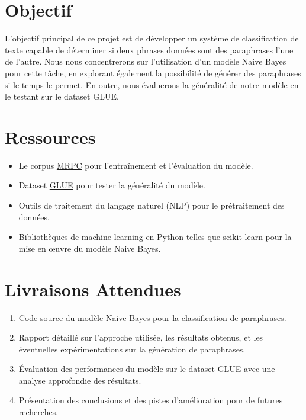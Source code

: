 \documentclass[12pt]{article}
\begin{document}



% 

\section{Objectif}
L'objectif principal de ce projet est de développer
un système de classification de texte capable de déterminer si deux
phrases données sont des paraphrases l'une de l'autre. Nous nous
concentrerons sur l'utilisation d'un modèle Naive Bayes pour cette
tâche, en explorant également la possibilité de générer des paraphrases
si le temps le permet. En outre, nous évaluerons la généralité de notre
modèle en le testant sur le dataset GLUE.

\section{Ressources}
\begin{itemize}
	\item Le corpus \href{https://paperswithcode.com/dataset/mrpc}{MRPC} pour l'entraînement et l'évaluation du modèle.
	\item Dataset \href{https://paperswithcode.com/dataset/glue}{GLUE} pour tester la généralité du modèle.
	\item Outils de traitement du langage naturel (NLP) pour le prétraitement des données.
	\item Bibliothèques de machine learning en Python telles que scikit-learn pour la mise en œuvre du modèle Naive Bayes.
\end{itemize}

\section{Livraisons Attendues}
\begin{enumerate}
	\item Code source du modèle Naive Bayes pour la classification de paraphrases.
	\item Rapport détaillé sur l'approche utilisée, les résultats obtenus, et les éventuelles expérimentations sur la génération de paraphrases.
	\item Évaluation des performances du modèle sur le dataset GLUE avec une analyse approfondie des résultats.
	\item Présentation des conclusions et des pistes d'amélioration pour de futures recherches.
\end{enumerate}
\end{document}
